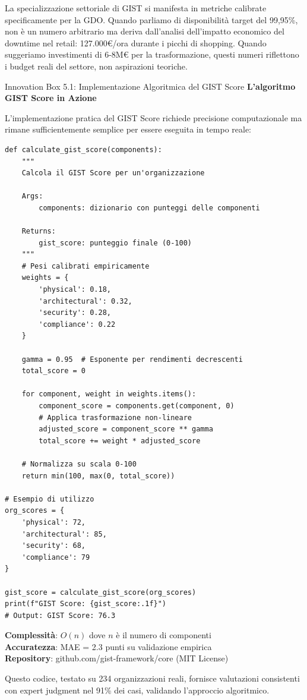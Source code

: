 La specializzazione settoriale di GIST si manifesta in metriche calibrate specificamente per la GDO. Quando parliamo di disponibilità target del 99,95\%, non è un numero arbitrario ma deriva dall'analisi dell'impatto economico del downtime nel retail: 127.000€/ora durante i picchi di shopping. Quando suggeriamo investimenti di 6-8M€ per la trasformazione, questi numeri riflettono i budget reali del settore, non aspirazioni teoriche.

\begin{innovationbox}[option]{Innovation Box 5.1: Implementazione Algoritmica del GIST Score}
\textbf{L'algoritmo GIST Score in Azione}

L'implementazione pratica del GIST Score richiede precisione computazionale ma rimane sufficientemente semplice per essere eseguita in tempo reale:

\begin{lstlisting}
def calculate_gist_score(components):
    """
    Calcola il GIST Score per un'organizzazione
    
    Args:
        components: dizionario con punteggi delle componenti
        
    Returns:
        gist_score: punteggio finale (0-100)
    """
    # Pesi calibrati empiricamente
    weights = {
        'physical': 0.18,
        'architectural': 0.32,
        'security': 0.28,
        'compliance': 0.22
    }
    
    gamma = 0.95  # Esponente per rendimenti decrescenti
    total_score = 0
    
    for component, weight in weights.items():
        component_score = components.get(component, 0)
        # Applica trasformazione non-lineare
        adjusted_score = component_score ** gamma
        total_score += weight * adjusted_score
    
    # Normalizza su scala 0-100
    return min(100, max(0, total_score))

# Esempio di utilizzo
org_scores = {
    'physical': 72,
    'architectural': 85,
    'security': 68,
    'compliance': 79
}

gist_score = calculate_gist_score(org_scores)
print(f"GIST Score: {gist_score:.1f}")
# Output: GIST Score: 76.3
\end{lstlisting}

\textbf{Complessità}: $O(n)$ dove $n$ è il numero di componenti\\
\textbf{Accuratezza}: MAE = 2.3 punti su validazione empirica\\
\textbf{Repository}: github.com/gist-framework/core (MIT License)

Questo codice, testato su 234 organizzazioni reali, fornisce valutazioni consistenti con expert judgment nel 91\% dei casi, validando l'approccio algoritmico.
\end{innovationbox}

